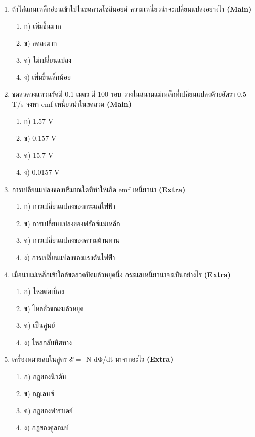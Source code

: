 \documentclass[12pt]{article}
\begin{document}
\begin{enumerate}[label=\arabic*.]
\begin{enumerate}[label=)]
\end{enumerate}
\item ถ้าใส่แกนเหล็กอ่อนเข้าไปในขดลวดโซลินอยด์ ความเหนี่ยวนำจะเปลี่ยนแปลงอย่างไร \hfill \textbf{\small (Main)}
\begin{enumerate}[label=)]
\item ก) เพิ่มขึ้นมาก
\item ข) ลดลงมาก
\item ค) ไม่เปลี่ยนแปลง
\item ง) เพิ่มขึ้นเล็กน้อย
\end{enumerate}
\item ขดลวดวงแหวนรัศมี 0.1 เมตร มี 100 รอบ วางในสนามแม่เหล็กที่เปลี่ยนแปลงด้วยอัตรา 0.5 T/s จงหา emf เหนี่ยวนำในขดลวด \hfill \textbf{\small (Main)}
\begin{enumerate}[label=)]
\item ก) 1.57 V
\item ข) 0.157 V
\item ค) 15.7 V
\item ง) 0.0157 V
\end{enumerate}
\item การเปลี่ยนแปลงของปริมาณใดที่ทำให้เกิด emf เหนี่ยวนำ \hfill \textbf{\small (Extra)}
\begin{enumerate}[label=)]
\item ก) การเปลี่ยนแปลงของกระแสไฟฟ้า
\item ข) การเปลี่ยนแปลงของฟลักซ์แม่เหล็ก
\item ค) การเปลี่ยนแปลงของความต้านทาน
\item ง) การเปลี่ยนแปลงของแรงดันไฟฟ้า
\end{enumerate}
\item เมื่อนำแม่เหล็กเข้าใกล้ขดลวดปิดแล้วหยุดนิ่ง กระแสเหนี่ยวนำจะเป็นอย่างไร \hfill \textbf{\small (Extra)}
\begin{enumerate}[label=)]
\item ก) ไหลต่อเนื่อง
\item ข) ไหลชั่วขณะแล้วหยุด
\item ค) เป็นศูนย์
\item ง) ไหลกลับทิศทาง
\end{enumerate}
\item เครื่องหมายลบในสูตร ℰ = -N dΦ/dt มาจากอะไร \hfill \textbf{\small (Extra)}
\begin{enumerate}[label=)]
\item ก) กฎของนิวตัน
\item ข) กฎเลนซ์
\item ค) กฎของฟาราเดย์
\item ง) กฎของคูลอมบ์

\end{enumerate}
\end{enumerate}
\end{document}
